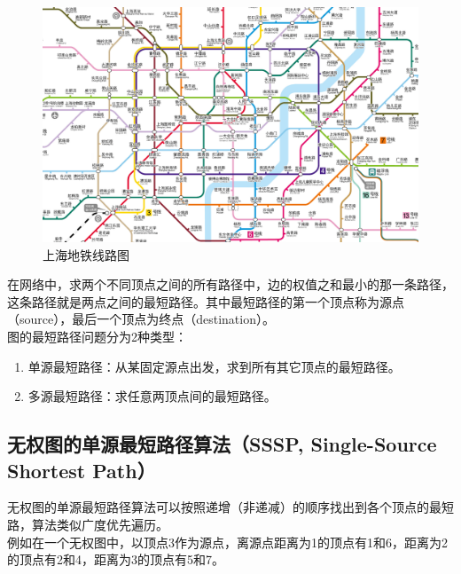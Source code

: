 \begin{figure}[H]
	\centering
	\includegraphics[scale=0.3]{img/Chapter10/10-5/1.png}
	\caption{上海地铁线路图}
\end{figure}

在网络中，求两个不同顶点之间的所有路径中，边的权值之和最小的那一条路径，这条路径就是两点之间的最短路径。其中最短路径的第一个顶点称为源点（source），最后一个顶点为终点（destination）。\\

图的最短路径问题分为2种类型：

\begin{enumerate}
	\item 单源最短路径：从某固定源点出发，求到所有其它顶点的最短路径。
	\item 多源最短路径：求任意两顶点间的最短路径。
\end{enumerate}

\vspace{0.5cm}

\subsection{无权图的单源最短路径算法（SSSP, Single-Source Shortest Path）}

无权图的单源最短路径算法可以按照递增（非递减）的顺序找出到各个顶点的最短路，算法类似广度优先遍历。\\

例如在一个无权图中，以顶点3作为源点，离源点距离为1的顶点有1和6，距离为2的顶点有2和4，距离为3的顶点有5和7。


